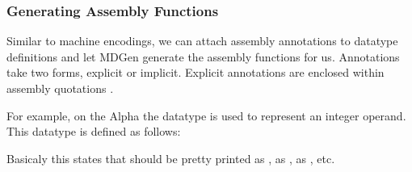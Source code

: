 \subsubsection{Generating Assembly Functions}
   Similar to machine encodings, we can attach assembly annotations to
datatype definitions and let MDGen generate the assembly functions for us.  
Annotations take two forms, explicit or implicit.
Explicit annotations are enclosed within assembly quotations .

 
For example, on the Alpha the datatype  is used to represent
an integer operand.  This datatype is defined as follows:
Basicaly this states that  should be pretty printed 
as ,  
as ,  
as ,
etc.
 
